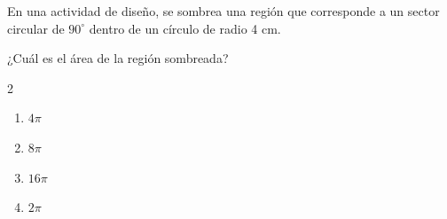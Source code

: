 En una actividad de diseño, se sombrea una región que corresponde a un sector circular de $90^\circ$ dentro de un círculo de radio 4 cm.

\begin{center}
\end{center}

¿Cuál es el área de la región sombreada?

\begin{multicols}{2}
\begin{enumerate}[label=\alph*), leftmargin=*]
\item $4\pi$
\item $8\pi$
\item $16\pi$
\item $2\pi$
\end{enumerate}
\end{multicols}